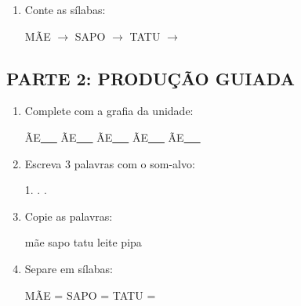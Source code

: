 \begin{exercicio}
\begin{enumerate}
  \item Conte as sílabas:
  \begin{center}
  MÃE $\rightarrow$ \underline{\hspace{0.9cm}} \quad SAPO $\rightarrow$ \underline{\hspace{0.9cm}} \quad TATU $\rightarrow$ \underline{\hspace{0.9cm}}
  \end{center}

\end{enumerate}

\subsection*{PARTE 2: PRODUÇÃO GUIADA}

\begin{enumerate}[resume]

  \item Complete com a grafia da unidade:
  \begin{center}
  ÃE\underline{~~~} \quad ÃE\underline{~~~} \quad ÃE\underline{~~~} \quad ÃE\underline{~~~} \quad ÃE\underline{~~~}
  \end{center}

  \item Escreva 3 palavras com o som-alvo:
  \begin{center}
  1. \underline{\hspace{3cm}} . \underline{\hspace{3cm}} . \underline{\hspace{3cm}}
  \end{center}

  \item Copie as palavras:
  \begin{center}
  mãe \quad sapo \quad tatu \quad leite \quad pipa
  \end{center}

  \item Separe em sílabas:
  \begin{center}
  MÃE = \underline{\hspace{1cm}} \underline{\hspace{1cm}} \quad SAPO = \underline{\hspace{1cm}} \underline{\hspace{1cm}} \quad TATU = \underline{\hspace{1cm}} \underline{\hspace{1cm}}
  \end{center}


\end{enumerate}
\end{exercicio}
